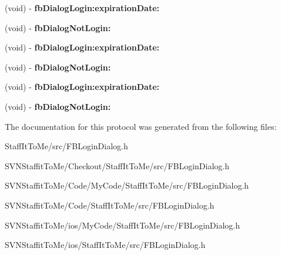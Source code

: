 \begin{DoxyCompactItemize}
\item 
\hypertarget{protocol_f_b_login_dialog_delegate-p_abc4d0728b26e963af7e14faeca22fd63}{
(void) -\/ {\bfseries fb\-Dialog\-Login\-:expiration\-Date\-:}}
\label{protocol_f_b_login_dialog_delegate-p_abc4d0728b26e963af7e14faeca22fd63}

\item 
\hypertarget{protocol_f_b_login_dialog_delegate-p_a99b3ef421a3bf8ce145089b21e88acc0}{
(void) -\/ {\bfseries fb\-Dialog\-Not\-Login\-:}}
\label{protocol_f_b_login_dialog_delegate-p_a99b3ef421a3bf8ce145089b21e88acc0}

\item 
\hypertarget{protocol_f_b_login_dialog_delegate-p_abc4d0728b26e963af7e14faeca22fd63}{
(void) -\/ {\bfseries fb\-Dialog\-Login\-:expiration\-Date\-:}}
\label{protocol_f_b_login_dialog_delegate-p_abc4d0728b26e963af7e14faeca22fd63}

\item 
\hypertarget{protocol_f_b_login_dialog_delegate-p_a99b3ef421a3bf8ce145089b21e88acc0}{
(void) -\/ {\bfseries fb\-Dialog\-Not\-Login\-:}}
\label{protocol_f_b_login_dialog_delegate-p_a99b3ef421a3bf8ce145089b21e88acc0}

\item 
\hypertarget{protocol_f_b_login_dialog_delegate-p_abc4d0728b26e963af7e14faeca22fd63}{
(void) -\/ {\bfseries fb\-Dialog\-Login\-:expiration\-Date\-:}}
\label{protocol_f_b_login_dialog_delegate-p_abc4d0728b26e963af7e14faeca22fd63}

\item 
\hypertarget{protocol_f_b_login_dialog_delegate-p_a99b3ef421a3bf8ce145089b21e88acc0}{
(void) -\/ {\bfseries fb\-Dialog\-Not\-Login\-:}}
\label{protocol_f_b_login_dialog_delegate-p_a99b3ef421a3bf8ce145089b21e88acc0}

\end{DoxyCompactItemize}


\-The documentation for this protocol was generated from the following files\-:\begin{DoxyCompactItemize}
\item 
\-Staff\-It\-To\-Me/src/\-F\-B\-Login\-Dialog.\-h\item 
\-S\-V\-N\-Staffit\-To\-Me/\-Checkout/\-Staff\-It\-To\-Me/src/\-F\-B\-Login\-Dialog.\-h\item 
\-S\-V\-N\-Staffit\-To\-Me/\-Code/\-My\-Code/\-Staff\-It\-To\-Me/src/\-F\-B\-Login\-Dialog.\-h\item 
\-S\-V\-N\-Staffit\-To\-Me/\-Code/\-Staff\-It\-To\-Me/src/\-F\-B\-Login\-Dialog.\-h\item 
\-S\-V\-N\-Staffit\-To\-Me/ios/\-My\-Code/\-Staff\-It\-To\-Me/src/\-F\-B\-Login\-Dialog.\-h\item 
\-S\-V\-N\-Staffit\-To\-Me/ios/\-Staff\-It\-To\-Me/src/\-F\-B\-Login\-Dialog.\-h\end{DoxyCompactItemize}
